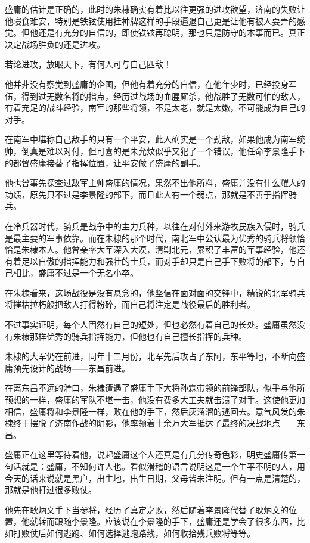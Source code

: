 \begin{multicols}{\theparacolNo}
		盛庸的估计是正确的，此时的朱棣确实有着比以往更强的进攻欲望，济南的失败让他寝食难安，特别是铁铉使用挂神牌这样的手段逼退自己更是让他有被人耍弄的感觉。但他还是有充分的自信的，即使铁铉再聪明，那也只是防守的本事而已。真正决定战场胜负的还是进攻。

		若论进攻，放眼天下，有何人可与自己匹敌！

		他并非没有察觉到盛庸的企图，但他有着充分的自信，在他年少时，已经投身军伍，得到过无数名将的指点，经历过战场的血腥厮杀，他战胜了无数可怕的敌人，有着充足的战斗经验，南军的那些将领，不是太老，就是太嫩，不可能成为自己的对手。

		在南军中堪称自己敌手的只有一个平安，此人确实是一个劲敌，如果他成为南军统帅，倒真是难以对付，但可喜的是朱允炆似乎又犯了一个错误，他任命李景隆手下的都督盛庸接替了指挥位置，让平安做了盛庸的副手。

		他也曾事先探查过敌军主帅盛庸的情况，果然不出他所料，盛庸并没有什么耀人的功绩，原先只不过是李景隆的部下，而且此人有一个弱点，那就是不善于指挥骑兵。

		在冷兵器时代，骑兵是战争中的主力兵种，以往在对付外来游牧民族入侵时，骑兵是最主要的军事依靠。而在朱棣的那个时代，南北军中公认最为优秀的骑兵将领恰恰是朱棣本人。他曾亲率大军深入大漠，清剿北元，累积了丰富的军事经验，他还有着足以自傲的指挥能力和强壮的士兵，而对手却只是自己手下败将的部下，与自己相比，盛庸不过是一个无名小卒。

		在朱棣看来，这场战役是没有悬念的，他坚信在面对面的交锋中，精锐的北军骑兵将摧枯拉朽般把敌人打得粉碎，而自己将注定是战役最后的胜利者。

		不过事实证明，每个人固然有自己的短处，但也必然有着自己的长处。盛庸虽然没有朱棣那样优秀的骑兵指挥能力，但他也有自己擅长指挥的兵种。

		朱棣的大军仍在前进，同年十二月份，北军先后攻占了东阿，东平等地，不断向盛庸预先设计的战场——东昌前进。

		在离东昌不远的滑口，朱棣遭遇了盛庸手下大将孙霖带领的前锋部队，似乎与他所预想的一样，盛庸的军队不堪一击，他没有费多大工夫就击溃了对手。这使他更加相信，盛庸将和李景隆一样，败在他的手下，然后灰溜溜的逃回去。意气风发的朱棣终于摆脱了济南作战的阴影，他率领着十余万大军抵达了最终的决战地点——东昌。

		盛庸正在这里等待着他，说起盛庸这个人还真是有几分传奇色彩，明史盛庸传第一句话就是：盛庸，不知何许人也。看似滑稽的语言说明这是一个生平不明的人，用今天的话来说就是黑户，出生地，出生日期，父母皆未注明。但有一点是清楚的，那就是他打过很多败仗。

		他先在耿炳文手下当参将，经历了真定之败，然后随着李景隆代替了耿炳文的位置，他就转而跟随李景隆。应该说在李景隆的手下，盛庸还是学会了很多东西，比如打败仗后如何逃跑、如何选择逃跑路线，如何收拾残兵败将等等。


\end{multicols}
